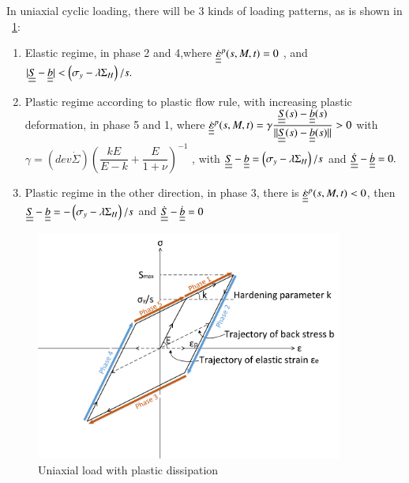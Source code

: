 \documentclass[3p,times,number,review]{elsarticle}
\newcommand{\figref}[1]{\figurename~\ref{#1}}
\begin{document}
\noindent
In uniaxial cyclic loading, there will be 3 kinds of loading patterns, as is shown in \figref{backstress}:

\vspace{6pt}
\begin{enumerate}
	
	\item	Elastic regime, in phase 2 and 4,where $\dot{\uline{\uline{\varepsilon}}}^p(s,M,t)=0$ ,  and $|\uline{\uline{S}}-\uline{\uline{b}}|<\left( \sigma_y-\lambda \Sigma_H\right)/s. $ 
	\vspace{6pt}
	
	\item Plastic regime according to plastic flow rule, with increasing plastic deformation, in phase 5 and 1, where	$\dot{\uline{\uline{\varepsilon}}}^p(s,M,t)=\gamma\dfrac{\uline{\uline{S}}(s)-\uline{\uline{b}}(s)}{||\uline{\uline{S}}(s)-\uline{\uline{b}}(s)||}> 0$ with  $\gamma=\left( dev\dot{\Sigma}\right)\left(\dfrac{kE}{E-k}+\dfrac{E}{1+\nu} \right) ^{-1}$ ,  with $\uline{\uline{S}}-\uline{\uline{b}}=\left( \sigma_y-\lambda \Sigma_H\right)/s$ and $\dot{\uline{\uline{S}}}-\dot{\uline{\uline{b}}}=0.$ 
	\vspace{6pt}
	
	\item Plastic regime in the other direction, in phase 3, there is	$\dot{\uline{\uline{\varepsilon}}}^p(s,M,t)<0$,  then $\uline{\uline{S}}-\uline{\uline{b}}=-\left( \sigma_y-\lambda \Sigma_H\right)/s$ and $\dot{\uline{\uline{S}}}-\dot{\uline{\uline{b}}}=0$ 
	
\end{enumerate}	

\begin{figure}[!h]
	\centering
	\includegraphics[width=0.9\textwidth]{figures//backstress.png} 
	\caption{Uniaxial load with plastic dissipation}
	\label{backstress}
\end{figure}
\end{document}
